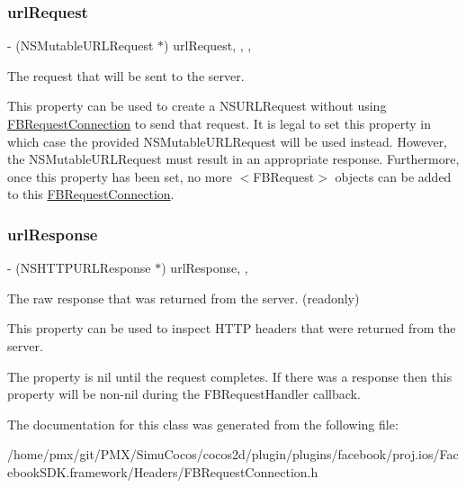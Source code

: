 \subsubsection{\texorpdfstring{url\+Request}{urlRequest}}
{\footnotesize\ttfamily -\/ (N\+S\+Mutable\+U\+R\+L\+Request $\ast$) url\+Request\hspace{0.3cm}{\ttfamily [read]}, {\ttfamily [write]}, {\ttfamily [nonatomic]}, {\ttfamily [retain]}}

The request that will be sent to the server.

This property can be used to create a {\ttfamily N\+S\+U\+R\+L\+Request} without using {\ttfamily \hyperlink{interfaceFBRequestConnection}{F\+B\+Request\+Connection}} to send that request. It is legal to set this property in which case the provided {\ttfamily N\+S\+Mutable\+U\+R\+L\+Request} will be used instead. However, the {\ttfamily N\+S\+Mutable\+U\+R\+L\+Request} must result in an appropriate response. Furthermore, once this property has been set, no more $<$\+F\+B\+Request$>$ objects can be added to this {\ttfamily \hyperlink{interfaceFBRequestConnection}{F\+B\+Request\+Connection}}. \mbox{\label{interfaceFBRequestConnection_a7d85948b4a9b9cad6675587e36307bb3}} 
\subsubsection{\texorpdfstring{url\+Response}{urlResponse}}
{\footnotesize\ttfamily -\/ (N\+S\+H\+T\+T\+P\+U\+R\+L\+Response $\ast$) url\+Response\hspace{0.3cm}{\ttfamily [read]}, {\ttfamily [nonatomic]}, {\ttfamily [retain]}}

The raw response that was returned from the server. (readonly)

This property can be used to inspect H\+T\+TP headers that were returned from the server.

The property is nil until the request completes. If there was a response then this property will be non-\/nil during the F\+B\+Request\+Handler callback. 

The documentation for this class was generated from the following file\+:\begin{DoxyCompactItemize}
\item 
/home/pmx/git/\+P\+M\+X/\+Simu\+Cocos/cocos2d/plugin/plugins/facebook/proj.\+ios/\+Facebook\+S\+D\+K.\+framework/\+Headers/F\+B\+Request\+Connection.\+h\end{DoxyCompactItemize}
